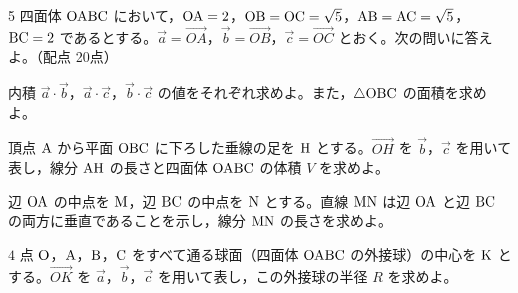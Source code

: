 \begin{monsheet}
\begin{daimon}{5}
四面体 $\mathrm{OABC}$ において，$\mathrm{OA}=2$，$\mathrm{OB}=\mathrm{OC}=\sqrt{5}$，$\mathrm{AB}=\mathrm{AC}=\sqrt{5}$，$\mathrm{BC}=2$ であるとする。$\vec{a}=\Vec{OA}$，$\vec{b}=\Vec{OB}$，$\vec{c}=\Vec{OC}$ とおく。次の問いに答えよ。\hfill（配点 20点）
\begin{shomon}
  \item 内積 $\vec{a}\cdot\vec{b}$，$\vec{a}\cdot\vec{c}$，$\vec{b}\cdot\vec{c}$ の値をそれぞれ求めよ。また，$\triangle\mathrm{OBC}$ の面積を求めよ。
  \item 頂点 $\mathrm{A}$ から平面 $\mathrm{OBC}$ に下ろした垂線の足を $\mathrm{H}$ とする。$\Vec{OH}$ を $\vec{b}$，$\vec{c}$ を用いて表し，線分 $\mathrm{AH}$ の長さと四面体 $\mathrm{OABC}$ の体積 $V$ を求めよ。
  \item 辺 $\mathrm{OA}$ の中点を $\mathrm{M}$，辺 $\mathrm{BC}$ の中点を $\mathrm{N}$ とする。直線 $\mathrm{MN}$ は辺 $\mathrm{OA}$ と辺 $\mathrm{BC}$ の両方に垂直であることを示し，線分 $\mathrm{MN}$ の長さを求めよ。
  \item $4$ 点 $\mathrm{O}$，$\mathrm{A}$，$\mathrm{B}$，$\mathrm{C}$ をすべて通る球面（四面体 $\mathrm{OABC}$ の外接球）の中心を $\mathrm{K}$ とする。$\Vec{OK}$ を $\vec{a}$，$\vec{b}$，$\vec{c}$ を用いて表し，この外接球の半径 $R$ を求めよ。
\end{shomon}
\end{daimon}

\scratchpage
\end{monsheet}
